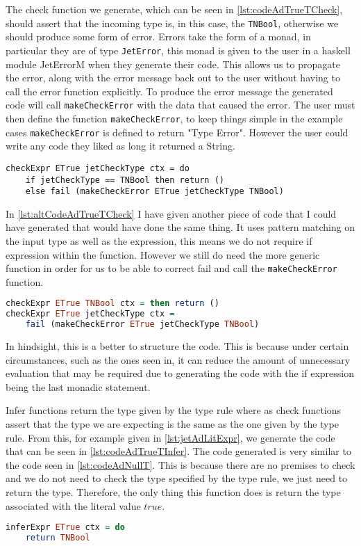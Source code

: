 The check function we generate, which can be seen in \autoref{lst:codeAdTrueTCheck}, should assert that the incoming type is, in this case, the \texttt{TNBool}, otherwise we should produce some form of error.
Errors take the form of a monad, in particular they are of type \texttt{JetError}, this monad is given to the user in a haskell module JetErrorM when they generate their code.
This allows us to propagate the error, along with the error message back out to the user without having to call the error function explicitly.
To produce the error message the generated code will call \texttt{makeCheckError} with the data that caused the error.
The user must then define the function \texttt{makeCheckError}, to keep things simple in the example cases \texttt{makeCheckError} is defined to return "Type Error".
However the user could write any code they liked as long it returned a String.

\begin{lstlisting}[caption = Code generated for checkExpr from AdTrueT, label=lst:codeAdTrueTCheck]
checkExpr ETrue jetCheckType ctx = do
    if jetCheckType == TNBool then return () 
    else fail (makeCheckError ETrue jetCheckType TNBool)
\end{lstlisting}

In \autoref{lst:altCodeAdTrueTCheck} I have given another piece of code that I could have generated that would have done the same thing.
It uses pattern matching on the input type as well as the expression, this means we do not require if expression within the function.
However we still do need the more generic function in order for us to be able to correct fail and call the \texttt{makeCheckError} function.

\begin{lstlisting}[caption = Alternate Code for checkExpr from AdTrueT, label=lst:altCodeAdTrueTCheck, language=Haskell]
checkExpr ETrue TNBool ctx = then return () 
checkExpr ETrue jetCheckType ctx = 
    fail (makeCheckError ETrue jetCheckType TNBool)
\end{lstlisting}

In hindsight, this is a better to structure the code.
This is because under certain circumstances, such as the ones seen in, it can reduce the amount of unnecessary evaluation that may be required due to generating the code with the if expression being the last monadic statement.

Infer functions return the type given by the type rule where as check functions assert that the type we are expecting is the same as the one given by the type rule.
From this, for example given in \autoref{lst:jetAdLitExpr}, we generate the code that can be seen in \autoref{lst:codeAdTrueTInfer}.
The code generated is very similar to the code seen in \autoref{lst:codeAdNullT}.
This is because there are no premises to check and we do not need to check the type specified by the type rule, we just need to return the type.
Therefore, the only thing this function does is return the type associated with the literal value $true$.

\begin{lstlisting}[caption = Code generated for inferExpr from AdTrueT, label=lst:codeAdTrueTInfer, language=Haskell]
inferExpr ETrue ctx = do
    return TNBool
\end{lstlisting}